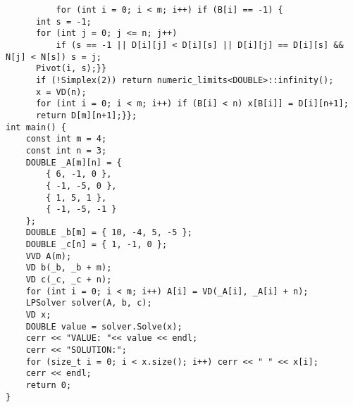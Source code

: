 \documentclass[8pt, oneside]{extarticle}
\begin{document}
\begin{multicols}{3}
\begin{lstlisting}
          for (int i = 0; i < m; i++) if (B[i] == -1) {
      int s = -1;
      for (int j = 0; j <= n; j++) 
          if (s == -1 || D[i][j] < D[i][s] || D[i][j] == D[i][s] && N[j] < N[s]) s = j;
      Pivot(i, s);}}
      if (!Simplex(2)) return numeric_limits<DOUBLE>::infinity();
      x = VD(n);
      for (int i = 0; i < m; i++) if (B[i] < n) x[B[i]] = D[i][n+1];
      return D[m][n+1];}};
int main() {
    const int m = 4;
    const int n = 3;  
    DOUBLE _A[m][n] = {
        { 6, -1, 0 },
        { -1, -5, 0 },
        { 1, 5, 1 },
        { -1, -5, -1 }
    };
    DOUBLE _b[m] = { 10, -4, 5, -5 };
    DOUBLE _c[n] = { 1, -1, 0 };
    VVD A(m);
    VD b(_b, _b + m);
    VD c(_c, _c + n);
    for (int i = 0; i < m; i++) A[i] = VD(_A[i], _A[i] + n);
    LPSolver solver(A, b, c);
    VD x;
    DOUBLE value = solver.Solve(x);
    cerr << "VALUE: "<< value << endl;
    cerr << "SOLUTION:";
    for (size_t i = 0; i < x.size(); i++) cerr << " " << x[i];
    cerr << endl;
    return 0;
}
\end{lstlisting}

\end{multicols}
\end{document}
